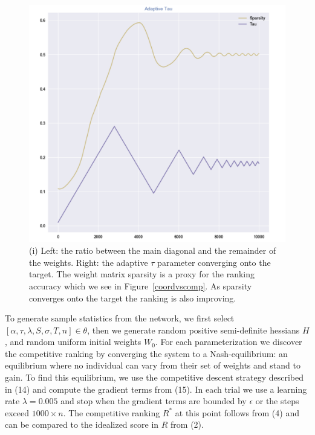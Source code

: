 \documentclass{article}
\begin{document}
\begin{figure}[!htb]
	\centering
	\includegraphics[scale=.27]{images/adaptive_tau.png}
	\caption{(i) Left: the ratio between the main diagonal and the remainder of the weights. Right: the adaptive $\tau$ parameter converging onto the target. The weight matrix sparsity is a proxy for the ranking accuracy which we see in Figure~\ref{coordvscomp}. As sparsity converges onto the target the ranking is also improving.}
	\label{adaptive_tau}
\end{figure}


To generate sample statistics from the network, we first select $[\alpha, \tau, \lambda, S, \sigma, T, n] \in \theta$, then we generate random positive semi-definite hessians $H$, and random uniform initial weights $W_0$. For each parameterization we discover the competitive ranking by converging the system to a Nash-equilibrium: an equilibrium where no individual can vary from their set of weights and stand to gain. \cite{dtting2017optimal} To find this equilibrium, we use the competitive descent strategy described in (14) and compute the gradient terms from (15). In each trial we use a learning rate $\lambda = 0.005$ and stop when the gradient terms are bounded by $\epsilon$ or the steps exceed $1000 \times n$. The competitive ranking $R^*$ at this point follows from (4) and can be compared to the idealized score in $R$ from (2).
\smallskip
\end{document}
